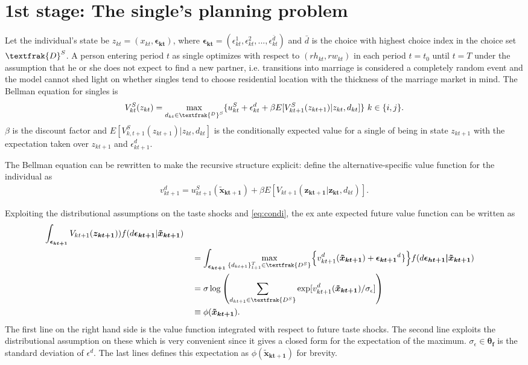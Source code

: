 \section{1st stage: The single's planning problem}
Let the individual's state be $z_{kt}=(x_{kt},\boldsymbol{\epsilon_{kt}})$, where $\boldsymbol{\epsilon_{kt}}=(\epsilon_{kt}^1,\epsilon_{kt}^2,...,\epsilon_{kt}^{\bar{d}})$ and $\bar{d}$ is the choice with highest choice index in the choice set $\textfrak{D}^S$. A person entering period $t$ as single optimizes with respect to $(rh_{kt},rw_{kt})$ in each period $t=t_0$ until $t=T$ under the assumption that he or she does not expect to find a new partner, i.e. transitions into marriage is considered a completely random event and the model cannot shed light on whether singles tend to choose residential location with the thickness of the marriage market in mind. The Bellman equation for singles is
\begin{align}
V_{kt}^S(z_{kt})= \max_{d_{kt}\in \textfrak{^D}^S}\{u_{kt}^S+\epsilon_{kt}^d+\beta E[V_{kt+1}^S(z_{kt+1})|z_{kt},d_{kt}]\} \text{ }k\in\{i,j\}.
\label{eq:Vk}
\end{align}
$\beta$ is the discount factor and $E[V_{k,t+1}^S(z_{kt+1})|z_{kt},d_{kt}]$ is the conditionally expected value for a single of being in state $z_{kt+1}$ with the expectation taken over $z_{kt+1}$ and $\epsilon_{kt+1}^d$. 

The Bellman equation can be rewritten to make the recursive structure explicit: define the alternative-specific value function for the individual as
\begin{align}
v_{kt+1}^d=u_{kt+1}^S(\boldsymbol{\tilde{x}_{kt+1}})+\beta E[V_{kt+1}(\boldsymbol{z_{kt+1}}|\boldsymbol{z_{kt}},d_{kt})].
\label{eq:vk}
\end{align}

Exploiting the distributional assumptions on the taste shocks and \eqref{eq:condi}, the ex ante expected future value function can be written as
\begin{alignat*}{3}
\int_{\boldsymbol{\epsilon_{kt+1}}}{ V_{kt+1}(\boldsymbol{z_{kt+1}}))f(d\boldsymbol{\epsilon_{kt+1}}|\boldsymbol{\tilde{x}_{kt+1}})} \\
& &&= \int_{\boldsymbol{\epsilon_{kt+1}}}{ \max_{\{d_{kt+1}\}_{t+1}^{T}\in \textfrak{D^S}_{}} } \Big\{v_{kt+1}^{d_{}}(\boldsymbol{\tilde{x}_{kt+1}}) +\boldsymbol{\epsilon_{kt+1}}^{d_{}}\} \Big\}f(d\boldsymbol{\epsilon_{ht+1}|\tilde{x}_{kt+1}}) \\
& &&=\sigma \log {\left( \sum_{d_{kt+1} \in \textfrak{D^S}} { \exp[v_{kt+1}^{d_{}}(\boldsymbol{\tilde{x}_{kt+1}})/ \sigma_{\epsilon}]  } \right)} \\
& &&\equiv\phi(\boldsymbol{\tilde{x}_{kt+1}}). 
\end{alignat*}
The first line on the right hand side is the value function integrated with respect to future taste shocks. The second line exploits the distributional assumption on these which is very convenient since it gives a closed form for the expectation of the maximum. $\sigma_{\epsilon}\in\boldsymbol{\theta_f}$ is the standard deviation of $\epsilon^d.$ The last lines defines this expectation as $\phi(\boldsymbol{\tilde{x}_{kt+1}})$ for brevity.

